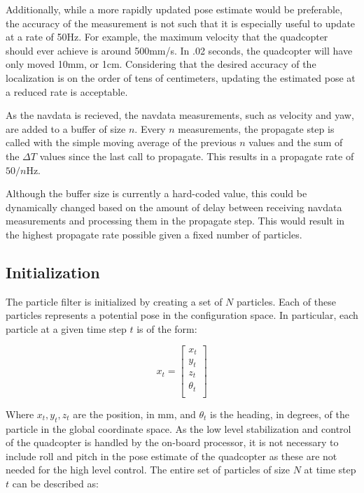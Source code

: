 Additionally, while a more rapidly updated pose estimate would be preferable, the accuracy of the measurement is not such that it is especially useful to update at a rate of 50Hz. For example, the maximum velocity that the quadcopter should ever achieve is around 500mm/s. In .02 seconds, the quadcopter will have only moved 10mm, or 1cm. Considering that the desired accuracy of the localization is on the order of tens of centimeters, updating the estimated pose at a reduced rate is acceptable.

As the navdata is recieved, the navdata measurements, such as velocity and yaw, are added to a buffer of size $n$. Every $n$ measurements, the propagate step is called with the simple moving average of the previous $n$ values and the sum of the $\Delta T$ values since the last call to propagate. This results in a propagate rate of $50/n$Hz.

Although the buffer size is currently a hard-coded value, this could be dynamically changed based on the amount of delay between receiving navdata measurements and processing them in the propagate step. This would result in the highest propagate rate possible given a fixed number of particles.

\subsection{Initialization}

The particle filter is initialized by creating a set of $N$ particles. Each of these particles represents a potential pose in the configuration space. In particular, each particle at a given time step $t$ is of the form:

\[x_t = \begin{bmatrix} 
	  x_t\\
	  y_t\\
	  z_t\\
	  \theta_t\\
	\end{bmatrix}	
\]

Where $x_t, y_t, z_t$ are the position, in mm, and $\theta_t$ is the heading, in degrees, of the particle in the global coordinate space. As the low level stabilization and control of the quadcopter is handled by the on-board processor, it is not necessary to include roll and pitch in the pose estimate of the quadcopter as these are not needed for the high level control. The entire set of particles of size $N$ at time step $t$ can be described as:

